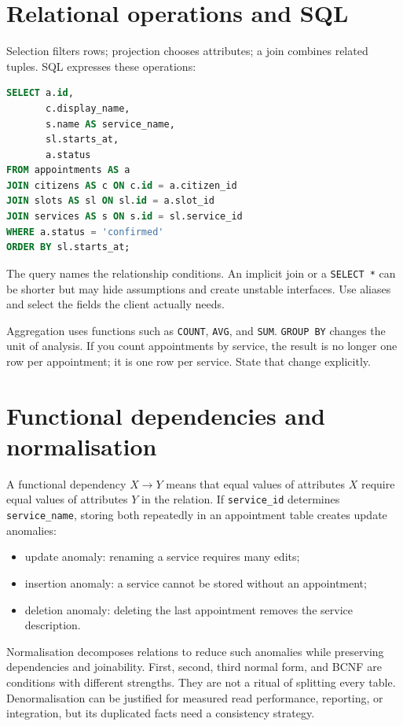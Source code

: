 \section{Relational operations and SQL}
Selection filters rows; projection chooses attributes; a join combines related tuples. SQL expresses these operations:

\begin{lstlisting}[language=SQL,caption={A query that joins appointments to citizens and services.}]
SELECT a.id,
       c.display_name,
       s.name AS service_name,
       sl.starts_at,
       a.status
FROM appointments AS a
JOIN citizens AS c ON c.id = a.citizen_id
JOIN slots AS sl ON sl.id = a.slot_id
JOIN services AS s ON s.id = sl.service_id
WHERE a.status = 'confirmed'
ORDER BY sl.starts_at;
\end{lstlisting}

The query names the relationship conditions. An implicit join or a \texttt{SELECT *} can be shorter but may hide assumptions and create unstable interfaces. Use aliases and select the fields the client actually needs.

Aggregation uses functions such as \texttt{COUNT}, \texttt{AVG}, and \texttt{SUM}. \texttt{GROUP BY} changes the unit of analysis. If you count appointments by service, the result is no longer one row per appointment; it is one row per service. State that change explicitly.

\section{Functional dependencies and normalisation}
A functional dependency $X\rightarrow Y$ means that equal values of attributes $X$ require equal values of attributes $Y$ in the relation. If \texttt{service\_id} determines \texttt{service\_name}, storing both repeatedly in an appointment table creates update anomalies:
\begin{itemize}
\item update anomaly: renaming a service requires many edits;
\item insertion anomaly: a service cannot be stored without an appointment;
\item deletion anomaly: deleting the last appointment removes the service description.
\end{itemize}
Normalisation decomposes relations to reduce such anomalies while preserving dependencies and joinability. First, second, third normal form, and BCNF are conditions with different strengths. They are not a ritual of splitting every table. Denormalisation can be justified for measured read performance, reporting, or integration, but its duplicated facts need a consistency strategy.


